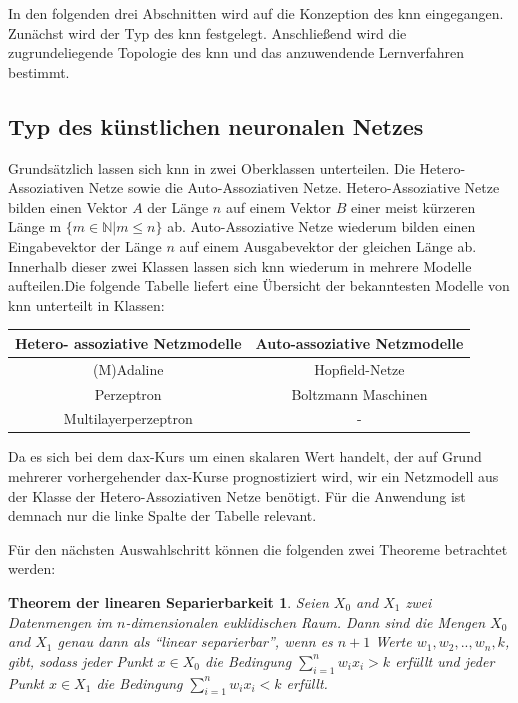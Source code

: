 In den folgenden drei Abschnitten wird auf die Konzeption des \ac{knn} eingegangen. Zunächst wird der Typ des \ac{knn} festgelegt. Anschließend wird die zugrundeliegende Topologie des \ac{knn} und das anzuwendende Lernverfahren bestimmt.

\subsection{Typ des künstlichen neuronalen Netzes}
\label{subsection:Typ des künstlichen neuronalen Netzes}

Grundsätzlich lassen sich \ac{knn} in zwei Oberklassen unterteilen. Die Hetero-Assoziativen Netze sowie die Auto-Assoziativen Netze. Hetero-Assoziative Netze bilden einen Vektor $A$ der Länge $n$ auf einem Vektor $B$ einer meist kürzeren Länge m $\{m \in \mathbb{N} | m \le n\}$ ab. Auto-Assoziative Netze wiederum bilden einen Eingabevektor der Länge $n$ auf einem Ausgabevektor der gleichen Länge ab. Innerhalb dieser zwei Klassen lassen sich \ac{knn} wiederum in mehrere Modelle aufteilen.Die folgende Tabelle liefert eine Übersicht der bekanntesten Modelle von \ac{knn} unterteilt in Klassen:

\begin{center}
\begin{tabular}{|c|c|}
\hline 
 Hetero- assoziative Netzmodelle & Auto-assoziative Netzmodelle \\ 
\hline 
(M)Adaline & Hopfield-Netze \\ 
\hline  
Perzeptron &  Boltzmann Maschinen \\ 
\hline 
Multilayerperzeptron & - \\ 
\hline 
\end{tabular} 
\end{center}

Da es sich bei dem \ac{dax}-Kurs um einen skalaren Wert handelt, der auf Grund mehrerer vorhergehender \ac{dax}-Kurse prognostiziert wird, wir ein Netzmodell aus der Klasse der Hetero-Assoziativen Netze benötigt. Für die Anwendung ist demnach nur die linke Spalte der Tabelle relevant. 

Für den nächsten Auswahlschritt können die folgenden zwei Theoreme betrachtet werden:

\newtheorem*{theorem2*}{Theorem der linearen Separierbarkeit}
\begin{theorem2*}
Seien $X_{0}$ and $X_{1}$ zwei Datenmengen im $n$-dimensionalen euklidischen Raum. Dann sind die Mengen $X_{0}$ and $X_{1}$ genau dann als "`linear separierbar"', wenn es  $n+1$ Werte $w_{1}, w_{2},..,w_{n}, k$, gibt, sodass jeder Punkt  $x \in X_{0}$ die Bedingung $\sum^{n}_{i=1} w_{i}x_{i} > k$ erfüllt und jeder Punkt $x \in X_{1}$ die Bedingung $\sum^{n}_{i=1} w_{i}x_{i} < k$ erfüllt.
\end{theorem2*}

